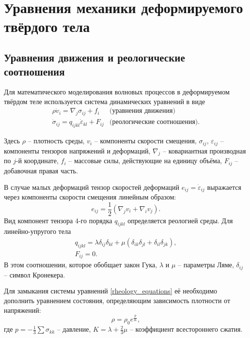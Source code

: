 \section{Уравнения механики деформируемого твёрдого тела}
\subsection{Уравнения движения и реологические соотношения}
Для математического моделирования волновых процессов в деформируемом твёрдом
теле используется система динамических уравнений \cite{novatsky,sedov} в виде
\begin{eqnarray}
\label{rheology_equations}
\rho\dot{v}_i=\nabla_j\sigma_{ij}+f_i & \textrm{(уравнения движения)}\nonumber\\
\dot{\sigma}_{ij}=q_{ijkl}\dot{\varepsilon}_{kl}+F_{ij} & \textrm{(реологические
соотношения).}
\end{eqnarray}

Здесь $\rho$ – плотность среды, $v_i$ – компоненты скорости смещения,
$\sigma_{ij}$, $\varepsilon_{ij}$ -- компоненты тензоров напряжений и деформаций,
$\nabla_j$ – ковариантная производная по $j$-й координате, $f_i$ – массовые
силы, действующие на единицу объёма, $F_{ij}$ -- добавочная правая часть.

В случае малых деформаций тензор скоростей деформаций $e_{ij}=\dot{\varepsilon}_{ij}$ 
выражается через компоненты скорости смещения линейным образом:
\begin{equation}
e_{ij}=\frac{1}{2}(\nabla_j v_i+\nabla_i v_j).
\end{equation}
Вид компонент тензора 4-го порядка $q_{ijkl}$ определяется реологией среды. Для 
линейно-упругого тела
\begin{eqnarray}
\label{tensor_qijkl}
q_{ijkl}=\lambda\delta_{ij}\delta_{kl}+\mu(\delta_{ik}\delta_{jl}+\delta_{il}
\delta_{jk}),\nonumber\\
F_{ij}=0.
\end{eqnarray}
В этом соотношении, которое обобщает закон Гука, $\lambda$ и $\mu$ -- параметры
Ляме, $\delta_{ij}$ -- символ Кронекера.

Для замыкания системы уравнений \ref{rheology_equations} её необходимо дополнить
уравнением состояния, определяющим зависимость плотности от напряжений:
$$\rho=\rho_0e^{\frac{p}{K}},$$
где $p=-\frac{1}{3}\sum\sigma_{kk}$ -- давление, $K=\lambda+\frac{2}{3}\mu$ --
коэффициент всестороннего сжатия.
